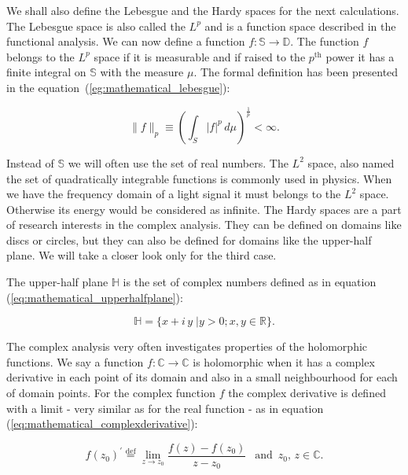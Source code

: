 \documentclass[12pt,twoside,a4paper]{article}
\numberwithin{equation}{subsection}
\numberwithin{figure}{subsection}
\begin{document}
We shall also define the Lebesgue and the Hardy spaces for the next calculations. The Lebesgue space is also called the $L^p$ and is a
function space described in the functional analysis. We can now define a function $f : \mathbb{S} \to \mathbb{D}$. The function $f$ belongs
to the $L^p$ space if it is measurable and if raised to the $p^{\text{th}}$ power it has a finite integral on $\mathbb{S}$ with the measure
$ \mu $. The formal definition has been presented in the equation~(\ref{eg:mathematical_lebesgue}):

\begin{equation} \label{eg:mathematical_lebesgue}
  \|f\|_p \equiv ( \int_{S} |f|^p \, d\mu) ^ {\frac{1}{p}} < \infty .
\end{equation}

Instead of $\mathbb{S}$ we will often use the set of real numbers. The $L^2$ space, also named the set of quadratically integrable functions
is commonly used in physics. When we have the frequency domain of a light signal it must belongs to the $L^2$ space. Otherwise its energy would
be considered as infinite. The Hardy spaces are a part of research interests in the complex analysis. They can be defined on domains like
discs or circles, but they can also be defined for domains like the upper-half plane. We will take a closer look only for the third case.

The upper-half plane $ \mathbb{H} $ is the set of complex numbers defined as in equation (\ref{eq:mathematical_upperhalfplane}):

\begin{equation} \label{eq:mathematical_upperhalfplane}
  \mathbb{H} = \{ x + i \, y \;| y > 0; x, y \in \mathbb{R} \} .
\end{equation}

The complex analysis very often investigates properties of the holomorphic functions. We say a function $f : \mathbb{C} \to \mathbb{C}$ is
holomorphic when it has a complex derivative in each point of its domain and also in a small neighbourhood for each of domain points. For
the complex function $f$ the complex derivative is defined with a limit - very similar as for the real function - as in equation
(\ref{eq:mathematical_complexderivative}):

\begin{equation} \label{eq:mathematical_complexderivative}
  f(z_0)^{'} \stackrel{\mathrm{def}}{=} \lim_{z \to z_0} \frac{f(z) - f(z_0)}{z - z_0} \; \, \text{ and } \, z_0, \, z \in \mathbb{C} .
\end{equation}
\end{document}
